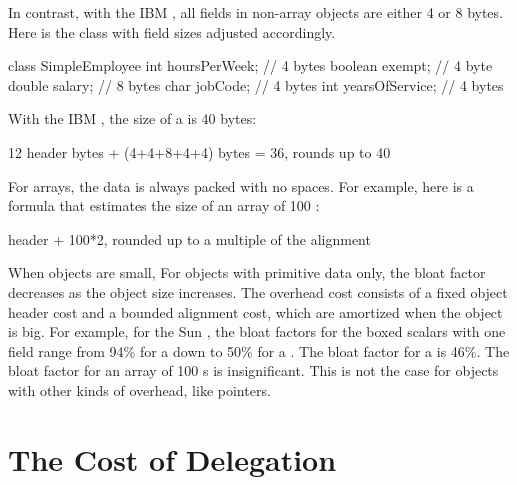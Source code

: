 In contrast, with the IBM \jre, all fields in non-array objects are either 4 or
8 bytes.  Here is the  class with field sizes adjusted
accordingly.
\begin{verbatim2} 
class SimpleEmployee {
    int hoursPerWeek;        // 4 bytes
    boolean exempt;          // 4 byte
    double salary;           // 8 bytes
    char jobCode;            // 4 bytes
    int yearsOfService;      // 4 bytes
}
\end{verbatim2}
With the IBM \jre, the size of a  is 40 bytes:
\begin{verbatim2}
12 header bytes + (4+4+8+4+4) bytes = 36, rounds up to 40
\end{verbatim2}
For arrays, the data is always packed with no spaces. For example, here is a
formula that estimates the size of an array of 100 :
\begin{verbatim2}
header + 100*2, rounded up to a multiple of the alignment
\end{verbatim2}

When objects are small, For objects with primitive data only, the bloat factor
decreases as the object size increases. The overhead cost consists of a fixed
object header cost and a bounded alignment cost, which are amortized when the
object is big.  For example, for the Sun \jre, the bloat factors for the boxed
scalars with one field range from 94\% for a  down to 50\% for a
.  The bloat factor for a  is 46\%.  The
bloat factor for an array of 100 s is insignificant. This is not the
case for objects with other kinds of overhead, like pointers.

\section{The Cost of Delegation}

